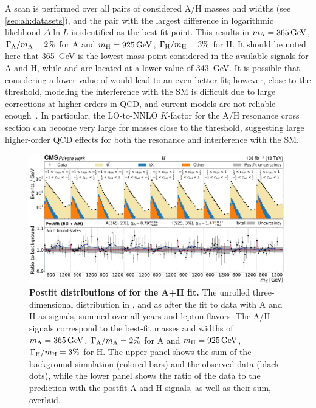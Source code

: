 A scan is performed over all pairs of considered A/H masses and widths (see \cref{sec:ah:datasets}), and the pair with the largest difference in logarithmic likelihood $\Delta \ln L$ is identified as the best-fit point. This results in $\mA = \SI{365}{\GeV}$, $\Gamma_{\mathrm{A}}/m_{\mathrm{A}} = 2\%$ for A and $\mH = \SI{925}{\GeV}$, $\Gamma_{\mathrm{H}}/m_{\mathrm{H}} = 3\%$ for H. It should be noted here that \SI{365}{\GeV} is the lowest mass point considered in the available signals for A and H, while \etat and \chit are located at a lower value of \SI{343}{\GeV}. It is possible that considering a lower value of \mA would lead to an even better fit; however, close to the \ttbar threshold, modeling the interference with the SM is difficult due to large corrections at higher orders in QCD, and current models are not reliable enough~\cite{Djouadi:2019,Djouadi:2024lyv}. In particular, the LO-to-NNLO $K$-factor for the A/H resonance cross section can become very large for masses close to the threshold, suggesting large higher-order QCD effects for both the resonance and interference with the SM.

\begin{figure}[!th]
    \centering
    \includegraphics[width=0.99\textwidth]{figures/ah/prepost/A_m365_w2p0__H_m925_w3p0_fit_s_ll_run2_both.pdf}
    \caption{
        \textbf{Postfit distributions of \mttchelchan for the A+H fit.} The unrolled three-dimensional distribution in \mtt, \chel and \chan as after the fit to data with A and H as signals, summed over all years and lepton flavors. The A/H signals correspond to the best-fit masses and widths of $\mA = \SI{365}{\GeV}$, $\Gamma_{\mathrm{A}}/m_{\mathrm{A}} = 2\%$ for A and $\mH = \SI{925}{\GeV}$, $\Gamma_{\mathrm{H}}/m_{\mathrm{H}} = 3\%$ for H. The upper panel shows the sum of the background simulation (colored bars) and the observed data (black dots), while the lower panel shows the ratio of the data to the prediction with the postfit A and H signals, as well as their sum, overlaid.
    }
    \label{fig:ah:postfit_ah_ll}
\end{figure}

